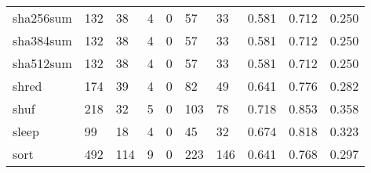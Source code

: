 \begin{longtable}{lp{2.0cm}p{2.0cm}p{2.0cm}p{2.0cm}p{2.0cm}p{2.0cm}p{2.0cm}p{2.0cm}p{2.0cm}}
sha256sum &                    132 &                                 38 &                                 4 &                                0 &                                57 &                              33 &                                0.581 &                                  0.712 &                                0.250 \\
sha384sum &                    132 &                                 38 &                                 4 &                                0 &                                57 &                              33 &                                0.581 &                                  0.712 &                                0.250 \\
sha512sum &                    132 &                                 38 &                                 4 &                                0 &                                57 &                              33 &                                0.581 &                                  0.712 &                                0.250 \\
shred     &                    174 &                                 39 &                                 4 &                                0 &                                82 &                              49 &                                0.641 &                                  0.776 &                                0.282 \\
shuf      &                    218 &                                 32 &                                 5 &                                0 &                               103 &                              78 &                                0.718 &                                  0.853 &                                0.358 \\
sleep     &                     99 &                                 18 &                                 4 &                                0 &                                45 &                              32 &                                0.674 &                                  0.818 &                                0.323 \\
sort      &                    492 &                                114 &                                 9 &                                0 &                               223 &                             146 &                                0.641 &                                  0.768 &                                0.297 \\

\end{longtable}
